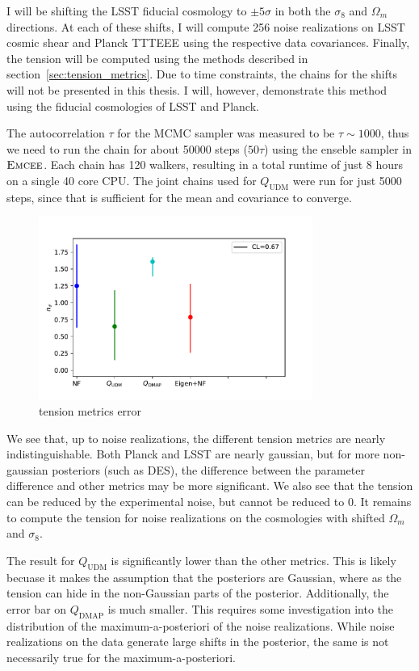 I will be shifting the LSST fiducial cosmology to $\pm5\sigma$ in both the $\sigma_8$ and $\Omega_m$ directions. At each of these shifts, I will compute 256 noise realizations on LSST cosmic shear and Planck TTTEEE using the respective data covariances. Finally, the tension will be computed using the methods described in section~\ref{sec:tension_metrics}. Due to time constraints, the chains for the shifts will not be presented in this thesis. I will, however, demonstrate this method using the fiducial cosmologies of LSST and Planck.

The autocorrelation $\tau$ for the MCMC sampler was measured to be $\tau\sim1000$, thus we need to run the chain for about 50000 steps ($50\tau$) using the enseble sampler in $\textsc{Emcee}$. Each chain has 120 walkers, resulting in a total runtime of just 8 hours on a single 40 core CPU. The joint chains used for $Q_{\mathrm{UDM}}$ were run for just 5000 steps, since that is sufficient for the mean and covariance to converge. 
\begin{figure}[tb]
	\centering
	\includegraphics[width=0.8\textwidth]{plots/metrics_new.pdf}
	\caption{tension metrics error}
	\label{fig:tension_metrics_error}
\end{figure}

We see that, up to noise realizations, the different tension metrics are nearly indistinguishable. Both Planck and LSST are nearly gaussian, but for more non-gaussian posteriors (such as DES), the difference between the parameter difference and other metrics may be more significant. We also see that the tension can be reduced by the experimental noise, but cannot be reduced to 0. It remains to compute the tension for noise realizations on the cosmologies with shifted $\Omega_m$ and $\sigma_8$.

The result for $Q_{\mathrm{UDM}}$ is significantly lower than the other metrics. This is likely becuase it makes the assumption that the posteriors are Gaussian, where as the tension can hide in the non-Gaussian parts of the posterior. Additionally, the error bar on $Q_{\mathrm{DMAP}}$ is much smaller. This requires some investigation into the distribution of the maximum-a-posteriori of the noise realizations. While noise realizations on the data generate large shifts in the posterior, the same is not necessarily true for the maximum-a-posteriori.

